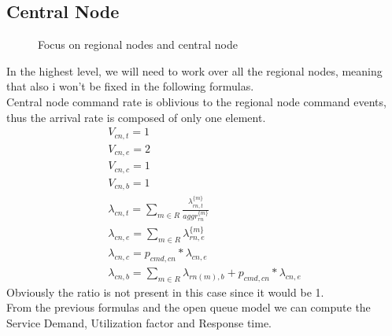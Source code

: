 \documentclass[11pt]{article}
\begin{document}
\subsection{Central Node}
\begin{figure}[H]
	\centering
	\hspace*{-3.7cm}
	\frame{}
	\caption{Focus on regional nodes and central node}
\end{figure}
In the highest level, we will need to work over all the regional nodes, meaning that also i won't be fixed in the following formulas.\\
Central node command rate is oblivious to the regional node command events, thus the arrival rate is composed of only one element.
\begin{equation}
	\begin{array}{l}
		V_{cn, t} = 1 \\
		V_{cn, e} = 2 \\ %
		V_{cn, c} = 1 \\
		V_{cn, b} = 1 \\
        \lambda_{cn, t} = \sum\limits_{m \in R}{ \frac{\lambda^{\{m\}}_{rn, t}}{aggr^{\{ m \}}_{rn}}}  \\
        \lambda_{cn, e} = \sum\limits_{m \in R}{\lambda^{\{m\}}_{rn, e}} \\
		\lambda_{cn, c} = p_{cmd,cn} * \lambda_{cn, e} \\
		\lambda_{cn, b} = \sum\limits_{m \in R}{\lambda_{rn(m), b}} + p_{cmd,cn} * \lambda_{cn, e}
	\end{array}
\end{equation}
Obviously the ratio is not present in this case since it would be 1.\\
From the previous formulas and the open queue model we can compute the Service Demand, Utilization factor and Response time.
\end{document}
